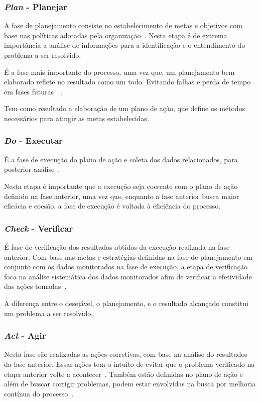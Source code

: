 \subsubsection{\textit{Plan} - Planejar}
A fase de planejamento consiste no estabelecimento de metas e objetivos com base nas políticas adotadas pela organização~\cite{pdcacont}. Nesta etapa é de extrema importância a análise de informações para a identificação e o entendimento do problema a ser resolvido.

É a fase mais importante do processo, uma vez que, um planejamento bem elaborado reflete no resultado como um todo. Evitando falhas e perda de tempo em fases futuras~\cite{fabio2003}~\cite{pdcacont}.

Tem como resultado a elaboração de um plano de ação, que define os métodos necessários para atingir as metas estabelecidas.

\subsubsection{\textit{Do} - Executar}
É a fase de execução do plano de ação e coleta dos dados relacionados, para posterior análise~\cite{pdcacont}.

Nesta etapa é importante que a execução seja coerente com o plano de ação definido na fase anterior, uma vez que, enquanto a fase anterior busca maior eficácia e coesão, a fase de execução é voltada à eficiência do processo.

\subsubsection{\textit{Check} - Verificar}
É fase de verificação dos resultados obtidos da execução realizada na fase anterior. Com base nas metas e estratégias definidas na fase de planejamento em conjunto com os dados monitorados na fase de execução, a etapa de verificação foca na análise sistemática dos dados monitorados afim de verificar a efetividade das ações tomadas~\cite{pdcacont}.

A diferença entre o desejável, o planejamento, e o resultado alcançado constitui um problema a ser resolvido.

\subsubsection{\textit{Act} - Agir}
Nesta fase são realizadas as ações corretivas, com base na análise do resultados da fase anterior. Essas ações tem o intuito de evitar que o problema verificado na etapa anterior volte a acontecer~\cite{pdcacont}. Também estão definidas no plano de ação e além de buscar corrigir problemas, podem estar envolvidas na busca por melhoria contínua do processo~\cite{pdcaknow}.

